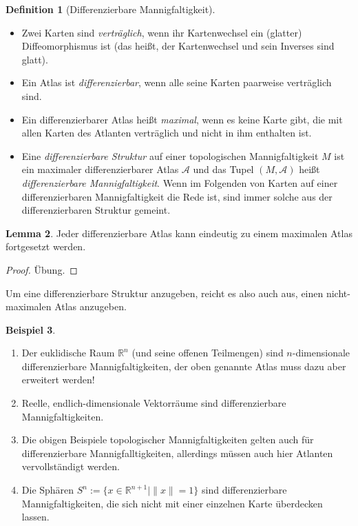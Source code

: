 \documentclass[a4paper]{scrbook}
\numberwithin{equation}{chapter}
\newcommand{\R}{\mathbb{R}}
\theoremstyle{definition}
\newtheorem{defn}{Definition}[section]
\newtheorem{lemma}[defn]{Lemma}
\newtheorem{bsp}[defn]{Beispiel}
\newcommand{\bewUeb}{\begin{proof}Übung.\end{proof}}
\begin{document}
		\begin{defn}[Differenzierbare Mannigfaltigkeit]\hfill
			\begin{itemize}
				\item Zwei Karten sind \emph{verträglich}, wenn ihr Kartenwechsel ein (glatter) Diffeomorphismus ist (das heißt, der Kartenwechsel und sein Inverses sind glatt).
				\item Ein Atlas ist \emph{differenzierbar}, wenn alle seine Karten paarweise verträglich sind.
				\item Ein differenzierbarer Atlas heißt \emph{maximal}, wenn es keine Karte gibt, die mit allen Karten des Atlanten verträglich und nicht in ihm enthalten ist.
				\item Eine \emph{differenzierbare Struktur} auf einer topologischen Mannigfaltigkeit $M$ ist ein maximaler differenzierbarer Atlas $\mathcal{A}$ und das Tupel $(M,\mathcal{A})$ heißt \emph{differenzierbare Mannigfaltigkeit}. Wenn im Folgenden von Karten auf einer differenzierbaren Mannigfaltigkeit die Rede ist, sind immer solche aus der differenzierbaren Struktur gemeint.
			\end{itemize}
		\end{defn}
		\begin{lemma}
			Jeder differenzierbare Atlas kann eindeutig zu einem maximalen Atlas fortgesetzt werden. \bewUeb
		\end{lemma}
		Um eine differenzierbare Struktur anzugeben, reicht es also auch aus, einen nicht-maximalen Atlas anzugeben.
		\begin{bsp}\hfill 
			\begin{enumerate}[label=(\alph*)]
				\item Der euklidische Raum $\R^n$ (und seine offenen Teilmengen) sind $n$-dimensionale differenzierbare Mannigfaltigkeiten, der oben genannte Atlas muss dazu aber erweitert werden!
				\item Reelle, endlich-dimensionale Vektorräume sind differenzierbare Mannigfaltigkeiten.
				\item Die obigen Beispiele topologischer Mannigfaltigkeiten gelten auch für differenzierbare Mannigfalltigkeiten, allerdings müssen auch hier Atlanten vervollständigt werden.
				\item Die Sphären ${S^n:=\lbrace x\in\R^{n+1}\mid \|x\|=1\rbrace}$ sind differenzierbare Mannigfaltigkeiten, die sich nicht mit einer einzelnen Karte überdecken lassen.
			\end{enumerate}
		\end{bsp}
\end{document}
